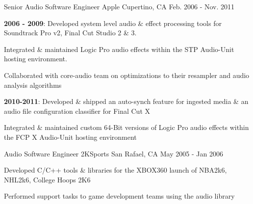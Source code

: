 \begin{cventries}
  \cventry
    {Senior Audio Software Engineer} %
    {Apple} %
    {Cupertino, CA} %
    {Feb. 2006 - Nov. 2011} %
    {
      \begin{cvitems} %
        \item {\textbf{2006 - 2009}: Developed system level audio \& effect processing tools for Soundtrack Pro v2, Final Cut Studio 2 \& 3}. 
        \item {Integrated \& maintained Logic Pro audio effects within the STP Audio-Unit hosting environment.}
        \item {Collaborated with core-audio team on optimizations to their resampler and audio analysis algorithms}
        \item {\textbf{2010-2011}: Developed \& shipped an auto-synch feature for ingested media \& an audio file configuration classifier for Final Cut X}
		\item {Integrated \& maintained custom 64-Bit versions of Logic Pro audio effects within the FCP X Audio-Unit hosting environment}
      \end{cvitems}
    }

  \cventry
    {Audio Software Engineer} %
    {2KSports} %
    {San Rafael, CA} %
    {May 2005 - Jan 2006} %
    {
      \begin{cvitems} %
        \item {Developed C/C++ tools \& libraries for the XBOX360 launch of NBA2k6, NHL2k6, College Hoops 2K6}
        \item {Performed support tasks to game development teams using the audio library}
      \end{cvitems}
    }

\end{cventries}
	